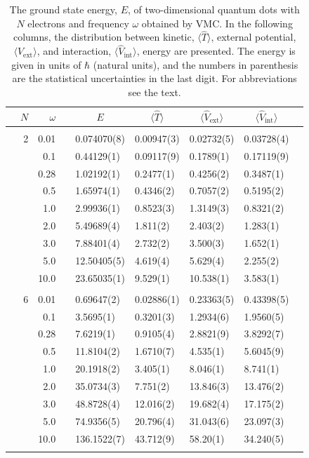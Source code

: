 \begin{table}[H]
	\caption{The ground state energy, $E$, of two-dimensional quantum dots with $N$ electrons and frequency $\omega$ obtained by VMC. In the following columns, the distribution between kinetic, $\langle\hat{T}\rangle$, external potential, $\langle\hat{V}_{\text{ext}}\rangle$, and interaction, $\langle\hat{V}_{\text{int}}\rangle$, energy are presented. The energy is given in units of $\hbar$ (natural units), and the numbers in parenthesis are the statistical uncertainties in the last digit. For abbreviations see the text.}
	\label{tab:splitfrequencyQDVMC}
	\begin{tabularx}{\textwidth}{R{1cm}rrcR{2.3cm}R{2.3cm}R{2.3cm}R{2.3cm}R{1cm}} \hline\hline
		\makecell{\\ \phantom{$N$}} & $N$ & $\omega$ &&  &  &  &  & \\ \hline \\
		&2 & 0.01 && 0.074070(8) & 0.00947(3) & 0.02732(5) & 0.03728(4) \\
		&& 0.1 && 0.44129(1) & 0.09117(9) & 0.1789(1) & 0.17119(9) \\
		&& 0.28 && 1.02192(1) & 0.2477(1) & 0.4256(2) & 0.3487(1) \\
		&& 0.5 && 1.65974(1) & 0.4346(2) & 0.7057(2) & 0.5195(2)\\
		&& 1.0 && 2.99936(1) & 0.8523(3) & 1.3149(3) & 0.8321(2)\\
		&& 2.0 && 5.49689(4) & 1.811(2) & 2.403(2) & 1.283(1) \\
		&& 3.0 && 7.88401(4) & 2.732(2) & 3.500(3) & 1.652(1) \\ 
		&& 5.0 && 12.50405(5) & 4.619(4) & 5.629(4) & 2.255(2) \\
		&& 10.0 && 23.65035(1) & 9.529(1) & 10.538(1) & 3.583(1) \\
		\hline \\
		
		&6 & 0.01 && 0.69647(2) & 0.02886(1) & 0.23363(5) & 0.43398(5) \\
		&& 0.1 && 3.5695(1) & 0.3201(3) & 1.2934(6) & 1.9560(5) \\
		&& 0.28 && 7.6219(1) & 0.9105(4) & 2.8821(9) & 3.8292(7) \\
		&& 0.5 && 11.8104(2) & 1.6710(7) & 4.535(1) & 5.6045(9) \\
		&& 1.0 && 20.1918(2) & 3.405(1) & 8.046(1) & 8.741(1) \\
		&& 2.0 && 35.0734(3) & 7.751(2) & 13.846(3) & 13.476(2) \\
		&& 3.0 && 48.8728(4) & 12.016(2) & 19.682(4) & 17.175(2) \\ 
		&& 5.0 && 74.9356(5) & 20.796(4) & 31.043(6) & 23.097(3) \\
		&& 10.0 && 136.1522(7) & 43.712(9) & 58.20(1) & 34.240(5) \\
		\hline \\
		

\end{tabularx}
\end{table}
